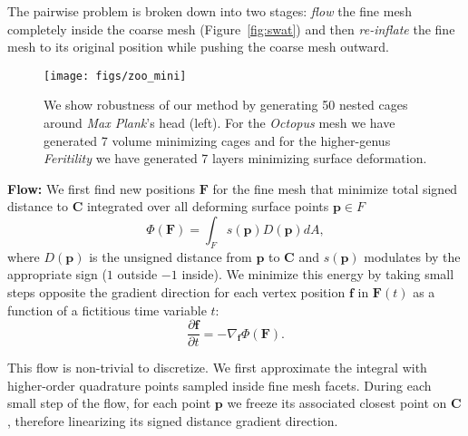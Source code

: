 \documentclass{cgyrf15}
\begin{document}
The pairwise problem is broken down into two stages: \emph{flow} the fine mesh
completely inside the coarse mesh  (Figure~\ref{fig:swat}) and then \emph{re-inflate} the
fine mesh to its original position while pushing the coarse mesh outward.

\begin{figure*}[t]
  \texttt{[image: figs/zoo\_mini]}
  \caption{We show robustness of our method by generating 50 nested cages
  around \emph{Max Plank}'s head (left). For the \emph{Octopus} mesh we have
  generated 7 volume minimizing cages and for the higher-genus
  \emph{Feritility} we have generated 7 layers minimizing surface deformation.
  }
  \label{fig:minizoo}
\end{figure*}

\noindent \textbf{Flow:} We first find new positions $\mathbf{F}$ for the fine
mesh that minimize total signed distance to $\mathbf{C}$ integrated over all
deforming surface points $\textbf{p} \in F$ \begin{equation}
\Phi(\mathbf{F}) = \int_F s(\mathbf{p})
D(\mathbf{p}) dA, \label{eq:flow_energy} \end{equation} where
$D(\mathbf{p})$ is the unsigned distance from $\mathbf{p}$ to $\mathbf{C} $
and $s(\mathbf{p})$ modulates by the appropriate sign
($1$ outside $-1$ inside). We minimize this energy by taking small steps opposite the gradient direction
for each vertex position $\mathbf{f}$ in $\mathbf{F}(t)$
as a function of a fictitious time variable $t$:
\begin{equation}
\frac{\partial \mathbf{f}}{\partial t} = - \nabla_{\mathbf{f}} \Phi(\mathbf{F}).
\label{eq:energy_gradient}
\end{equation}


This flow is non-trivial to discretize. We first approximate the integral with
higher-order quadrature points sampled inside fine mesh facets. 
During each small step of the flow,
for each point $\textbf{p}$ we freeze its associated closest point
on $\mathbf{C}$, therefore linearizing its signed distance gradient direction. 
\end{document}
